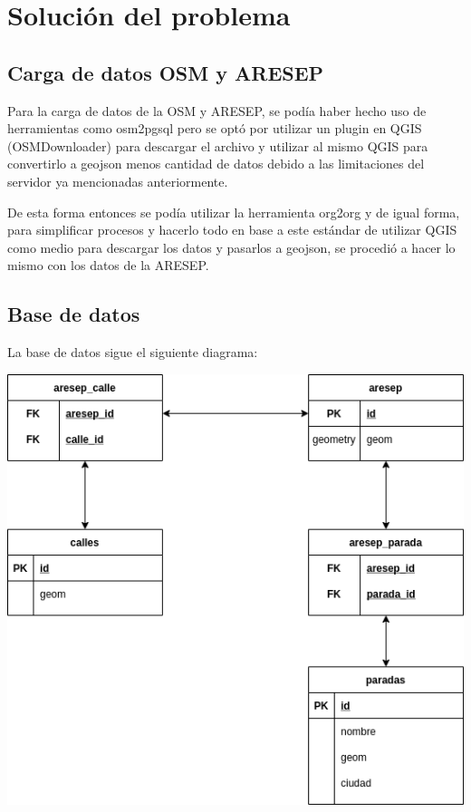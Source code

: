 \section{Solución del problema}

\subsection{Carga de datos OSM y ARESEP}
Para la carga de datos de la OSM y ARESEP, se podía haber hecho uso de herramientas como osm2pgsql pero se optó por utilizar un plugin en QGIS (OSMDownloader) para descargar el archivo y utilizar al mismo QGIS para convertirlo a geojson menos cantidad de datos debido a las limitaciones del servidor ya mencionadas anteriormente.

De esta forma entonces se podía utilizar la herramienta org2org y de igual forma, para simplificar procesos y hacerlo todo en base a este estándar de utilizar QGIS como medio para descargar los datos y pasarlos a geojson, se procedió a hacer lo mismo con los datos de la ARESEP.

\subsection{Base de datos}
La base de datos sigue el siguiente diagrama:
\begin{center}
	\includegraphics[scale=.65]{imagenes/diagram_db.png}
\end{center}

